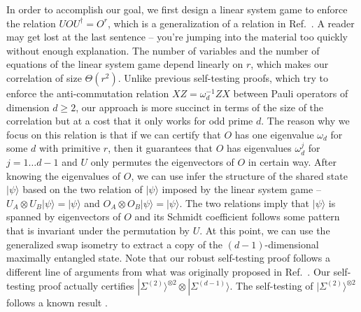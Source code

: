 \documentclass[11pt,letterpaper]{article}
\newcommand{\ket}[1]{|#1\rangle}
\newcommand{\x}{\otimes}
\newcommand{\ct}{^{\dagger}}
\newcommand{\1}{\mathbb{1}}
\newcommand{\EPR}[1]{\Sigma^{(#1)}}
\def\carl#1{{\color{blue} #1}}
\theoremstyle{definition}
\begin{document}
In order to accomplish our goal, we first design a linear system game to enforce the 
relation $UOU\ct = O^r$, which is a generalization of a relation in Ref.~\cite{slofstra2017}.  \carl{A reader may get lost at the last sentence -- you're jumping into the material too quickly without enough explanation.}
The number of variables and the number of equations of the linear system game depend linearly on $r$,
which makes our correlation of size $\Theta(r^2)$.
Unlike previous self-testing proofs, which try to enforce the anti-commutation relation
$XZ = \omega_d^{-1} ZX$ between Pauli operators of dimension $d \geq 2$, 
our approach is more succinct in terms of the size of the correlation but at a cost that
it only works for odd prime $d$.
The reason why we focus on this relation is that if we can certify that $O$ has one eigenvalue $\omega_d$
for some $d$ with primitive $r$,
then it guarantees that $O$ has eigenvalues $\omega_d^j$ for $j = 1 \dots d-1$ and $U$ only
permutes the eigenvectors of $O$ in certain way.
After knowing the eigenvalues of $O$, we can use infer the structure of the shared state $\ket{\psi}$
based on the two relation of $\ket{\psi}$ imposed by the linear system game --
$U_A \x U_B \ket{\psi} = \ket{\psi}$ and $O_A \x O_B \ket{\psi} = \ket{\psi}$.
The two relations imply that $\ket{\psi}$ is spanned by eigenvectors of $O$ and its
Schmidt coefficient follows some pattern that is invariant under the permutation by $U$.
At this point, we can use the generalized swap isometry \cite{yang2013} to extract a copy of the 
$(d-1)$-dimensional maximally entangled state. Note that our robust self-testing proof 
follows a different line of arguments from what was originally
proposed in Ref.~\cite{yang2013}.
Our self-testing proof actually certifies $\ket{\EPR{2}}^{\x 2} \x \ket{\EPR{d-1}}$. 
The self-testing of $\ket{\EPR{2}}^{\x 2}$ follows a known result \cite{wu2016}.
\end{document}
